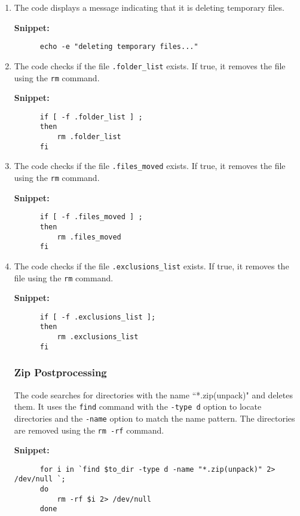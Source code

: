 \documentclass[12pt]{article}
\begin{document}
    \begin{enumerate}
      \item The code displays a message indicating that it is deleting temporary files.
      
      \textbf{Snippet:}
      \begin{verbatim}
      echo -e "deleting temporary files..."
      \end{verbatim}
      
      \item The code checks if the file \texttt{.folder\_list} exists. If true, it removes the file using the \texttt{rm} command.
      
      \textbf{Snippet:}
      \begin{verbatim}
      if [ -f .folder_list ] ;
      then
          rm .folder_list
      fi
      \end{verbatim}
      
      \item The code checks if the file \texttt{.files\_moved} exists. If true, it removes the file using the \texttt{rm} command.
      
      \textbf{Snippet:}
      \begin{verbatim}
      if [ -f .files_moved ] ;
      then
          rm .files_moved
      fi
      \end{verbatim}
      
      \item The code checks if the file \texttt{.exclusions\_list} exists. If true, it removes the file using the \texttt{rm} command.
      
      \textbf{Snippet:}
      \begin{verbatim}
      if [ -f .exclusions_list ];
      then
          rm .exclusions_list
      fi
      \end{verbatim}
      
       \subsubsection{Zip Postprocessing}\label{remunpack}
       The code searches for directories with the name ``*.zip(unpack)" and deletes them. It uses the \texttt{find} command with the \texttt{-type d} option to locate directories and the \texttt{-name} option to match the name pattern. The directories are removed using the \texttt{rm -rf} command.
      
      \textbf{Snippet:}
      \begin{verbatim}
      for i in `find $to_dir -type d -name "*.zip(unpack)" 2> /dev/null `;
      do
          rm -rf $i 2> /dev/null
      done
      \end{verbatim}
    \end{enumerate}
    
\end{document}
